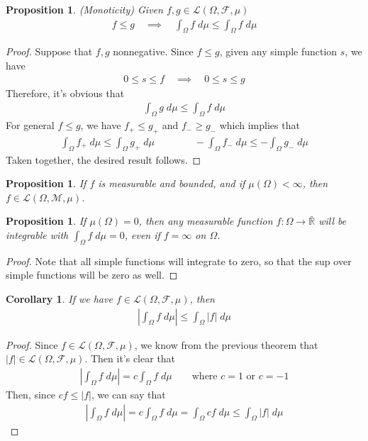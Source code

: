 \documentclass[12pt]{article}
\theoremstyle{plain}
\newtheorem{prop}[thm]{Proposition}
\newtheorem{cor}[thm]{Corollary}
\theoremstyle{definition}
\theoremstyle{remark}
\newcommand{\sF}{\mathscr{F}}
\begin{document}
\begin{prop}\emph{(Monoticity)}
Given $f,g\in\mathscr{L}(\Omega,\mathscr{F},\mu)$
\begin{align*}
  f \leq g
  \quad\implies\quad
  \int_\Omega f \; d\mu \leq \int_\Omega f \; d\mu
\end{align*}
\end{prop}
\begin{proof}
Suppose that $f,g$ nonnegative.
Since $f\leq g$, given any simple function $s$, we have
\begin{align*}
  0\leq s\leq f
  \quad\implies\quad
  0\leq s\leq g
\end{align*}
Therefore, it's obvious that
\begin{align*}
  \int_\Omega g \; d\mu \leq
  \int_\Omega f \; d\mu
\end{align*}
For general $f\leq g$, we have $f_+ \leq g_+$ and $f_- \geq g_-$ which
implies that
\begin{align*}
  \int_\Omega f_+ \; d\mu \leq
  \int_\Omega g_+ \; d\mu
  \qquad\qquad
  -\int_\Omega f_- \; d\mu \leq
  -\int_\Omega g_- \; d\mu
\end{align*}
Taken together, the desired result follows.
\end{proof}


\begin{prop}
If $f$ is measurable and bounded, and if $\mu(\Omega)<\infty$, then
$f\in\mathscr{L}(\Omega,\mathscr{M},\mu)$.
\end{prop}

\begin{prop}
If $\mu(\Omega)=0$, then \emph{any} measurable function $f:
\Omega\rightarrow\bar{\mathbb{R}}$ will be integrable with $\int_\Omega
f \; d\mu=0$, even if $f=\infty$ on $\Omega$.
\end{prop}
\begin{proof}
Note that all simple functions will integrate to zero, so that the sup
over simple functions will be zero as well.
\end{proof}


\begin{cor} If we have $f\in\mathscr{L}(\Omega,\sF,\mu)$, then
\begin{align*}
  \left\lvert \int_\Omega f \; d\mu\right\rvert \leq
  \int_\Omega \left\lvert f \right\rvert \; d\mu
\end{align*}
\end{cor}
\begin{proof}
Since $f\in\mathscr{L}(\Omega,\sF,\mu)$, we know from the previous
theorem that $|f|\in\mathscr{L}(\Omega,\sF,\mu)$. Then it's clear that
\begin{align*}
  \left\lvert \int_\Omega f \; d\mu\right\rvert
  = c \int_\Omega f \; d\mu\qquad\text{where $c=1$ or $c=-1$}
\end{align*}
Then, since $cf\leq |f|$, we can say that
\begin{align*}
  \left\lvert \int_\Omega f \; d\mu\right\rvert
  = c \int_\Omega f \; d\mu
  = \int_\Omega c f \; d\mu \leq
    \int_\Omega |f| \; d\mu
\end{align*}
\end{proof}
\end{document}
